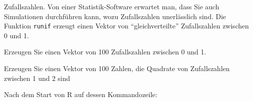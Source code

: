 Zufallszahlen. Von einer Statistik-Software erwartet man, dass Sie auch
Simulationen durchführen kann, wozu Zufallszahlen unerlässlich sind.
Die Funktion {\tt runif} erzeugt einen Vektor von ``gleichverteilte''
Zufallszahlen zwischen 0 und 1.
\begin{teilaufgaben}
\item Erzeugen Sie einen Vektor von 100 Zufallszahlen zwischen 0 und 1.
\item Erzeugen Sie einen Vektor von 100 Zahlen, die Quadrate
von Zufallszahlen zwischen 1 und 2 sind
\end{teilaufgaben}

\begin{loesung}
Nach dem Start von R auf dessen Kommandozeile:
\end{loesung}


